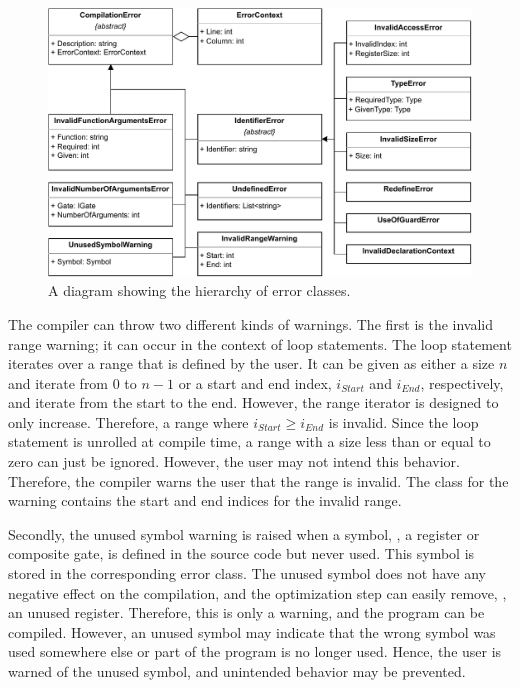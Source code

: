 \begin{figure}[htp]
    \centering
    \includegraphics[width=.9\textwidth]{../figures/drawio/uml_errors.pdf}
    \caption{A diagram showing the hierarchy of error classes.}
    \label{fig:implementation_uml_errors}
\end{figure}

The compiler can throw two different kinds of warnings. The first is the invalid range warning; it can occur in the context of loop statements. The loop statement iterates over a range that is defined by the user. It can be given as either a size $n$ and iterate from $0$ to $n-1$ or a start and end index, $i_{Start}$ and $i_{End}$, respectively, and iterate from the start to the end. However, the range iterator is designed to only increase. Therefore, a range where $i_{Start} \geq i_{End}$ is invalid. Since the loop statement is unrolled at compile time, a range with a size less than or equal to zero can just be ignored. However, the user may not intend this behavior. Therefore, the compiler warns the user that the range is invalid. The class for the warning contains the start and end indices for the invalid range.

Secondly, the unused symbol warning is raised when a symbol, \eg, a register or composite gate, is defined in the source code but never used. This symbol is stored in the corresponding error class. The unused symbol does not have any negative effect on the compilation, and the optimization step can easily remove, \eg, an unused register. Therefore, this is only a warning, and the program can be compiled. However, an unused symbol may indicate that the wrong symbol was used somewhere else or part of the program is no longer used. Hence, the user is warned of the unused symbol, and unintended behavior may be prevented.

